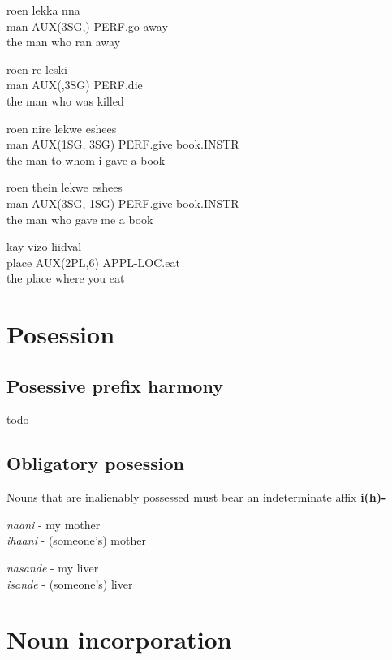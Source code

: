 \documentclass[11pt]{article}
\begin{document}
\begin{exe}
\ex
\gll roen \auxthreesg lekka nna \\
 man AUX(3SG,) PERF.go away \\
\trans the man who ran away

\ex
\gll roen re leski \\
man AUX(,3SG) PERF.die \\
\trans the man who was killed


\ex
\gll roen nire lekwe eshees \\
man AUX(1SG, 3SG) PERF.give book.INSTR \\
\trans the man to whom i gave a book

\ex
\gll roen thein lekwe eshees \\
man AUX(3SG, 1SG) PERF.give book.INSTR \\
\trans the man who gave me a book

\ex
\gll kay vizo liidval \\
place AUX(2PL,6) APPL-LOC.eat \\
\trans the place where you eat
\end{exe}


\section{Posession}

\subsection{Posessive prefix harmony}

todo

\subsection{Obligatory posession}

Nouns that are inalienably possessed must bear an indeterminate affix \textbf{i(h)-}

\begin{exe}
\ex \textit{naani} - my mother \\
 \textit{ihaani} - (someone's) mother

\ex \textit{nasande} - my liver \\
 \textit{isande} - (someone's) liver

\end{exe}


\section{Noun incorporation}
\end{document}
